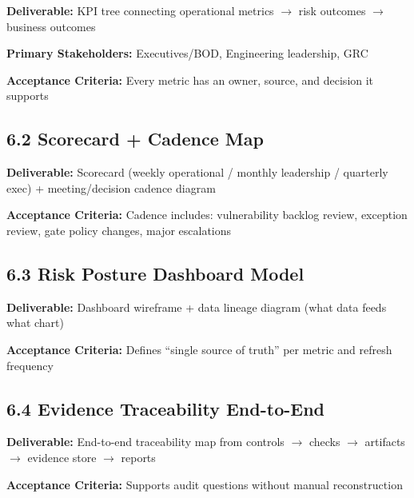 \documentclass[11pt,letterpaper]{article}
\newcommand{\storyfield}[2]{\textbf{#1:} #2}
\begin{document}
\begin{storycard}
\storyfield{Deliverable}{KPI tree connecting operational metrics $\rightarrow$ risk outcomes $\rightarrow$ business outcomes}

\storyfield{Primary Stakeholders}{Executives/BOD, Engineering leadership, GRC}

\storyfield{Acceptance Criteria}{Every metric has an owner, source, and decision it supports}
\end{storycard}

\subsection{6.2 Scorecard + Cadence Map}

\begin{storycard}
\storyfield{Deliverable}{Scorecard (weekly operational / monthly leadership / quarterly exec) + meeting/decision cadence diagram}

\storyfield{Acceptance Criteria}{Cadence includes: vulnerability backlog review, exception review, gate policy changes, major escalations}
\end{storycard}

\subsection{6.3 Risk Posture Dashboard Model}

\begin{storycard}
\storyfield{Deliverable}{Dashboard wireframe + data lineage diagram (what data feeds what chart)}

\storyfield{Acceptance Criteria}{Defines ``single source of truth'' per metric and refresh frequency}
\end{storycard}

\subsection{6.4 Evidence Traceability End-to-End}

\begin{storycard}
\storyfield{Deliverable}{End-to-end traceability map from controls $\rightarrow$ checks $\rightarrow$ artifacts $\rightarrow$ evidence store $\rightarrow$ reports}

\storyfield{Acceptance Criteria}{Supports audit questions without manual reconstruction}
\end{storycard}
\end{document}
